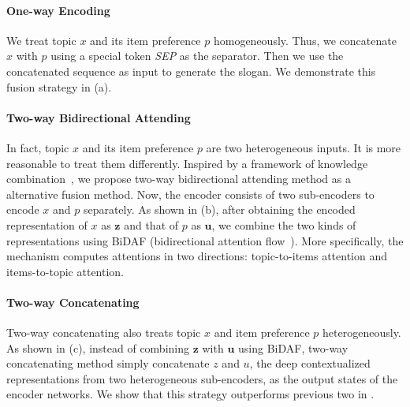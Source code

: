 \paragraph{One-way Encoding}
We treat topic $x$ and its item preference $p$ homogeneously.
Thus, we concatenate $x$ with $p$ using a special token \emph{SEP} as the separator. Then we use the concatenated sequence as input to generate the 
slogan.
We demonstrate this fusion strategy in  (a).


\paragraph{Two-way Bidirectional Attending}
In fact, topic $x$ and its item preference $p$ are two heterogeneous inputs.
It is more reasonable to treat them differently.
Inspired by a framework of knowledge combination~\cite{ChenLZYZ019}, 
we propose two-way bidirectional attending method as 
a alternative fusion method.
Now, the encoder consists of two sub-encoders to 
encode $x$ and $p$ separately.
As shown in  (b), after obtaining the encoded representation of $x$ as $\textbf{z}$ and that of $p$ as $\textbf{u}$, we combine the two kinds of representations using BiDAF (bidirectional attention flow~\cite{seo2016bidirectional}).
More specifically, the mechanism computes attentions in two directions:
topic-to-items attention and items-to-topic attention.

 

\paragraph{Two-way Concatenating}
Two-way concatenating also treats topic $x$ and item preference $p$ heterogeneously.
As shown in  (c), instead of combining $\textbf{z}$ with $\textbf{u}$ using BiDAF,
two-way concatenating method simply concatenate $z$ and $u$, the deep contextualized representations from two heterogeneous sub-encoders, as the output states of the encoder networks.
We show that this strategy outperforms previous two in .

